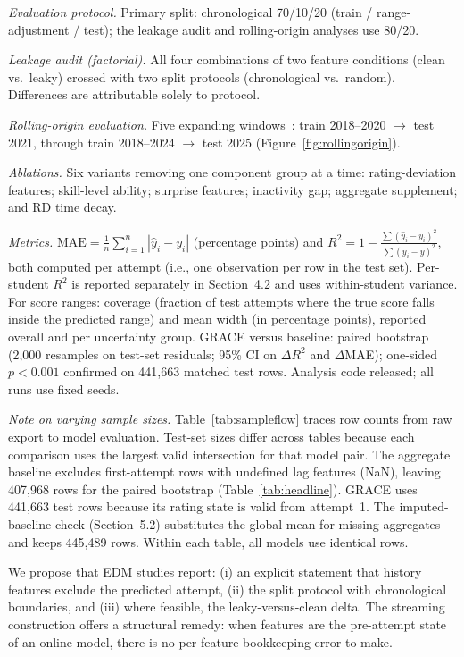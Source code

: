 \documentclass[11pt]{article}
\begin{document}
\textit{Evaluation protocol.}\quad
Primary split: chronological 70/10/20 (train / range-adjustment / test); the leakage
audit and rolling-origin analyses use 80/20.

\textit{Leakage audit (factorial).}\quad
All four combinations of two feature conditions (clean vs.\ leaky) crossed with two split
protocols (chronological vs.\ random).
Differences are attributable solely to protocol.

\textit{Rolling-origin evaluation.}\quad
Five expanding windows~\cite{tashman2000,bergmeir2012}: train 2018--2020 $\to$ test 2021,
through train 2018--2024 $\to$ test 2025 (Figure~\ref{fig:rollingorigin}).

\textit{Ablations.}\quad
Six variants removing one component group at a time: rating-deviation features;
skill-level ability; surprise features; inactivity gap; aggregate supplement; and RD time
decay.

\textit{Metrics.}\quad
\label{sec:metrics}
$\text{MAE} = \frac{1}{n}\sum_{i=1}^{n}|\hat{y}_i - y_i|$ (percentage points) and
$R^{2} = 1 - \frac{\sum(\hat{y}_i - y_i)^2}{\sum(y_i - \bar{y})^2}$,
both computed per attempt (i.e., one observation per row in the test set).
Per-student $R^{2}$ is reported separately in Section~4.2 and uses within-student variance.
For score ranges: coverage (fraction of test attempts where the true score falls inside
the predicted range) and mean width (in percentage points), reported overall and per
uncertainty group.
GRACE versus baseline: paired bootstrap (2{,}000 resamples on test-set residuals;
95\% CI on $\Delta R^{2}$ and $\Delta$MAE); one-sided $p < 0.001$ confirmed on
441{,}663 matched test rows.
Analysis code released; all runs use fixed seeds.

\medskip\noindent\textit{Note on varying sample sizes.}\quad
Table~\ref{tab:sampleflow} traces row counts from raw export to model evaluation.
Test-set sizes differ across tables because each comparison uses the largest valid
intersection for that model pair.
The aggregate baseline excludes first-attempt rows with undefined lag features (NaN),
leaving 407,968 rows for the paired bootstrap (Table~\ref{tab:headline}).
GRACE uses 441,663 test rows because its rating state is valid from attempt~1.
The imputed-baseline check (Section~5.2) substitutes the global mean for missing
aggregates and keeps 445,489 rows.
Within each table, all models use identical rows.


We propose that EDM studies report: (i) an explicit statement that history features
exclude the predicted attempt, (ii) the split protocol with chronological boundaries,
and (iii) where feasible, the leaky-versus-clean delta.
The streaming construction offers a structural remedy: when features are the pre-attempt
state of an online model, there is no per-feature bookkeeping error to make.
\end{document}
